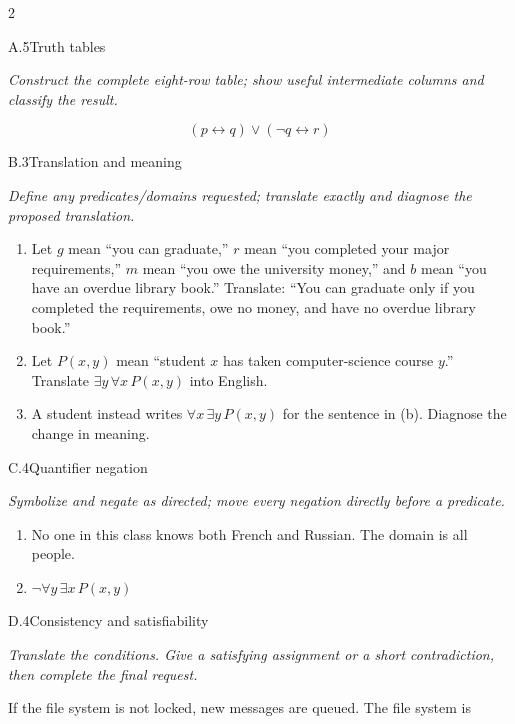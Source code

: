 \documentclass[9pt]{extarticle}
\begin{document}
\CoreWorkArea
\FormBreak
{}
\begin{multicols}{2}
\begin{CoreProblem}{A.5}{Truth tables}
{\scriptsize\textit{Construct the complete eight-row table; show useful intermediate columns and classify the result.}\par}
\[
  (p\leftrightarrow q)\lor(\neg q\leftrightarrow r)
\]
\end{CoreProblem}
\begin{CoreProblem}{B.3}{Translation and meaning}
{\scriptsize\textit{Define any predicates/domains requested; translate exactly and diagnose the proposed translation.}\par}
\begin{enumerate}[label=(\alph*)]
  \item Let $g$ mean ``you can graduate,'' $r$ mean ``you completed your major
        requirements,'' $m$ mean ``you owe the university money,'' and $b$
        mean ``you have an overdue library book.'' Translate: ``You can
        graduate only if you completed the requirements, owe no money, and
        have no overdue library book.''
  \item Let $P(x,y)$ mean ``student $x$ has taken computer-science course
        $y$.'' Translate $\exists y\,\forall x\,P(x,y)$ into English.
  \item A student instead writes $\forall x\,\exists y\,P(x,y)$ for the
        sentence in (b). Diagnose the change in meaning.
\end{enumerate}
\end{CoreProblem}
\begin{CoreProblem}{C.4}{Quantifier negation}
{\scriptsize\textit{Symbolize and negate as directed; move every negation directly before a predicate.}\par}
\begin{enumerate}[label=(\alph*)]
  \item No one in this class knows both French and Russian. The domain is all
        people.
  \item $\neg\forall y\,\exists x\,P(x,y)$
\end{enumerate}
\end{CoreProblem}
\columnbreak
\begin{CoreProblem}{D.4}{Consistency and satisfiability}
{\scriptsize\textit{Translate the conditions. Give a satisfying assignment or a short contradiction, then complete the final request.}\par}
If the file system is not locked, new messages are queued. The file system is

\end{CoreProblem}
\end{multicols}
\end{document}
